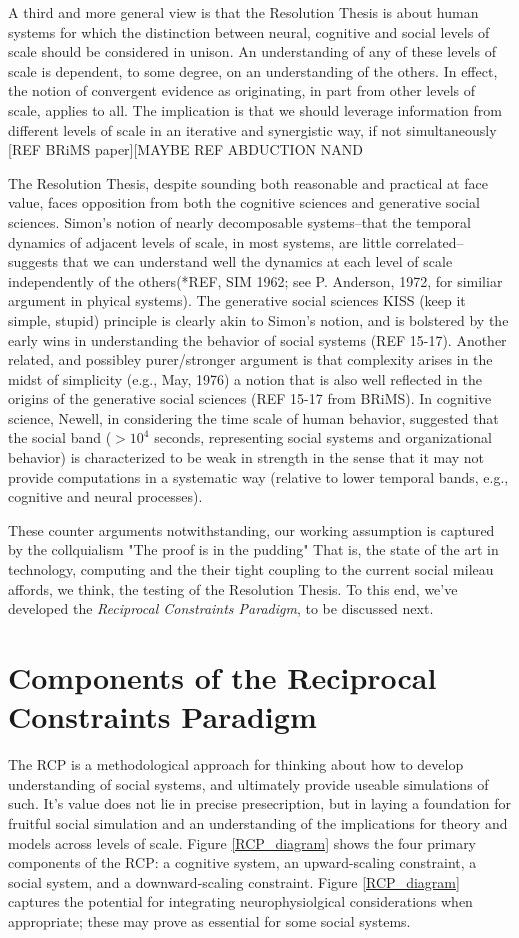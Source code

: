 \documentclass{article}
\begin{document}
A third and more general view is that the Resolution Thesis is about human systems for which the distinction between neural, cognitive and social levels of scale should be considered in unison.  An understanding of any of these levels of scale is dependent, to some degree, on an understanding of the others.  In effect, the notion of convergent evidence as originating, in part from other levels of scale, applies to all.  The implication is that we should leverage information from different levels of scale in an iterative and synergistic way, if not simultaneously [REF BRiMS paper][MAYBE REF ABDUCTION NAND 

The Resolution Thesis, despite sounding both reasonable and practical at face value, faces opposition from both the cognitive sciences and generative social sciences.  Simon's notion of nearly decomposable systems--that the temporal dynamics of adjacent levels of scale, in most systems, are little correlated--suggests that we can understand well the dynamics at each level of scale independently of the others(*REF, SIM 1962; see P. Anderson, 1972, for similiar argument in phyical systems).  The generative social sciences KISS (keep it simple, stupid) principle is clearly akin to Simon's notion, and is bolstered by the early wins in understanding the behavior of social systems (REF 15-17).   Another related, and possibley purer/stronger argument is that complexity arises in the midst of simplicity (e.g., May, 1976) a notion that is also well reflected in the origins of the generative social sciences (REF 15-17 from BRiMS).  In cognitive science, Newell, in considering the time scale of human behavior, suggested that the social band ($> 10^4$ seconds, representing social systems and organizational behavior) is characterized to be weak in strength in the sense that it may not provide computations in a systematic way (relative to lower temporal bands, e.g., cognitive and neural processes).  


These counter arguments notwithstanding, our working assumption is captured by the collquialism "The proof is in the pudding"  That is, the state of the art in technology, computing and the their tight coupling to the current social mileau affords, we think, the testing of the Resolution Thesis.   To this end, we've developed the \textit{Reciprocal Constraints Paradigm}, to be discussed next.


\section{Components of the Reciprocal Constraints Paradigm}
The RCP is a methodological approach for thinking about how to develop understanding of social systems, and ultimately provide useable simulations of such.  It's value does not lie in precise presecription, but in laying a foundation for fruitful social simulation and an understanding of the implications for theory and models across levels of scale.  Figure \ref{RCP_diagram} shows the four primary components of the RCP: a cognitive system, an upward-scaling constraint, a social system, and a downward-scaling constraint.  Figure \ref{RCP_diagram} captures the potential for integrating neurophysiolgical considerations when appropriate; these may prove as essential for some social systems.
\end{document}
